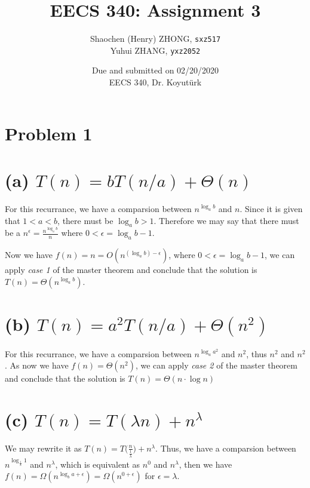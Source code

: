 \documentclass[11pt]{article}
\newcommand{\ilc}{\texttt}
\begin{document}
\title{\textbf{EECS 340: Assignment 3}}

\author{Shaochen (Henry) ZHONG, \ilc{sxz517} \\ Yuhui ZHANG, \ilc{yxz2052}}
\date{Due and submitted on 02/20/2020 \\ EECS 340, Dr. Koyut{\"u}rk}
\maketitle

\section{Problem 1}

\section{(a) $T(n) = bT(n/a) + \Theta(n)$}

For this recurrance, we have a comparsion between $n^{\log_a b}$ and $n$. Since it is given that $1 < a < b$, there must be $\log_a b > 1$. Therefore we may say that there must be a $n^\epsilon = \frac{n^{\log_a b}}{n}$ where $0 < \epsilon = \log_a b - 1$.

Now we have $f(n) = n = O(n^{(\log_a b) - \epsilon})$, where $0 < \epsilon = \log_a b - 1$, we can apply \textit{case 1} of the master theorem and conclude that the solution is $T(n) = \Theta(n^{\log_a b})$.

\section{(b) $T(n) = a^2 T(n/a) + \Theta(n^2)$}
For this recurrance, we have a comparsion between $n^{\log_a a^2}$ and $n^2$, thus $n^2$ and $n^2$. As now we have $f(n) = \Theta(n^2)$, we can apply \textit{case 2} of the master theorem and conclude that the solution is $T(n) = \Theta(n \cdot \log n)$


\section{(c) $T(n) = T(\lambda n) + n^{\lambda}$}

We may rewrite it as $T(n) = T\Big(\frac{n}{\frac{1}{\lambda}}\Big) + n^{\lambda}$. Thus, we have a comparsion between $n^{\log_{\frac{1}{\lambda}} 1}$ and $n^{\lambda}$, which is equivalent as $n^0$ and $n^{\lambda}$, then we have $f(n) = \Omega(n^{\log_b a + \epsilon}) = \Omega(n^{0 + \epsilon})$ for $\epsilon = \lambda$.
\end{document}
